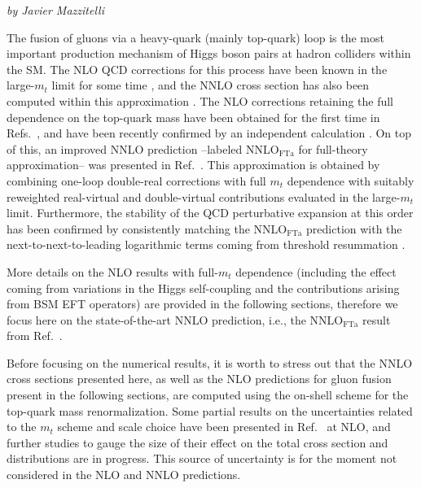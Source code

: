 \begin{center}
    \textit{by Javier Mazzitelli}
\end{center}

The fusion of gluons via a heavy-quark (mainly top-quark) loop is the most important production mechanism of Higgs boson pairs at hadron colliders within the SM.
The NLO QCD corrections for this process have been known in the large-$m_t$ limit for some time \cite{Dawson:1998py}, and the NNLO cross section has also been computed within this approximation \cite{deFlorian:2013jea}.
The NLO corrections retaining the full dependence on the top-quark mass have been obtained for the first time in Refs.~\cite{Borowka:2016ehy,Borowka:2016ypz}, and have been recently confirmed by an independent calculation \cite{Baglio:2018lrj}.
On top of this, an improved NNLO prediction --labeled NNLO$_{\mathrm{FTa}}$ for full-theory approximation-- was presented in Ref.~\cite{Grazzini:2018bsd}.
This approximation is obtained by combining one-loop double-real corrections with full $m_t$ dependence with suitably reweighted real-virtual and double-virtual contributions evaluated in the large-$m_t$ limit.
Furthermore, the stability of the QCD perturbative expansion at this order has been confirmed by consistently matching the NNLO$_{\mathrm{FTa}}$ prediction with the next-to-next-to-leading logarithmic terms coming from threshold resummation \cite{deFlorian:2018tah}.

More details on the NLO results with full-$m_t$ dependence (including the effect coming from variations in the Higgs self-coupling and the contributions arising from BSM EFT operators) are provided in the following sections, therefore we focus here on the state-of-the-art NNLO prediction, i.e., the NNLO$_{\mathrm{FTa}}$ result from Ref.~\cite{Grazzini:2018bsd}.

Before focusing on the numerical results, it is worth to stress out that the NNLO cross sections presented here, as well as the NLO predictions for gluon fusion present in the following sections, are computed using the on-shell scheme for the top-quark mass renormalization.
Some partial results on the uncertainties related to the $m_t$ scheme and scale choice have been presented in Ref.~\cite{Baglio:2018lrj} at NLO, and further studies to gauge the size of their effect on the total cross section and distributions are in progress.
This source of uncertainty is for the moment not considered in the NLO and NNLO predictions.

